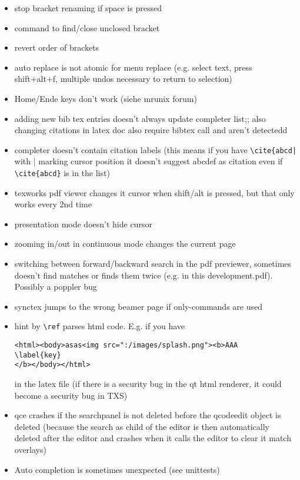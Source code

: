 \documentclass[10pt,a4paper,landscape]{report}
\begin{document}
\begin{itemize}
\item stop bracket renaming if space is pressed
\item command to find/close unclosed bracket
\item revert order of brackets
\item auto replace is not atomic for menu replace (e.g. select text, press shift+alt+f, multiple undos necessary to return to selection)
\item Home/Ende keys don't work (siehe mrunix forum)
\item adding new bib tex entries doesn't always update completer list;; also changing citations in latex doc also require bibtex call and aren't detectedd
\item completer doesn't contain citation labels (this means if you have \verb+\cite{abcd|+ with | marking cursor position it doesn't suggest abcdef as citation even if \verb+\cite{abcd}+ is in the list)
\item texworks pdf viewer changes it cursor when shift/alt is pressed, but that only works every 2nd time
\item presentation mode doesn't hide cursor
\item zooming in/out in continuous mode changes the current page
\item switching between forward/backward search in the pdf previewer, sometimes doesn't find matches or finds them twice (e.g. in this development.pdf). Possibly a poppler bug
\item synctex jumps to the wrong beamer page if only-commands are used
\item hint by \verb+\ref+ parses html code. E.g. if you have \begin{verbatim}
<html><body>asas<img src=":/images/splash.png"><b>AAA
\label{key}
</b></body></html>
\end{verbatim} in the latex file (if there is a security bug in the qt html renderer, it could become a security bug in TXS)
	\item  qce crashes if the searchpanel is not deleted before the qcodeedit object is deleted (because the search as child of the editor is then automatically deleted after the editor and crashes when it calls the editor to clear it match overlays)
	\item  Auto completion is sometimes unexpected (see unittests)
\end{itemize} 
\end{document}
